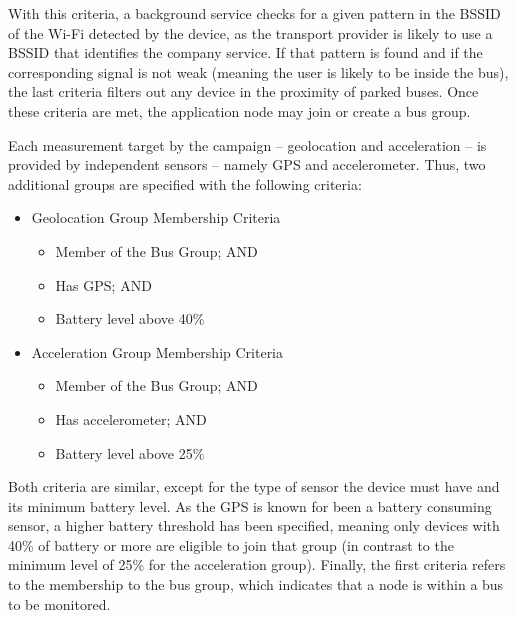With this criteria, a background service checks for a given pattern in the BSSID of the Wi-Fi detected by the device, as the transport provider is likely to use a BSSID that identifies the company service. If that pattern is found and if the corresponding signal is not weak (meaning the user is likely to be inside the bus), the last criteria filters out any device in the proximity of parked buses. Once these criteria are met, the application node may join or create a bus group.

Each measurement target by the campaign -- geolocation and acceleration -- is provided by independent sensors -- namely GPS and accelerometer. Thus, two additional groups are specified with the following criteria:

\begin{itemize}
	
	\item Geolocation Group Membership Criteria
	
	\begin{itemize}
		
		\item Member of the Bus Group; AND
		
		\item Has GPS; AND
		
		\item Battery level above 40\%
		
	\end{itemize}
	
	\item Acceleration Group Membership Criteria
	
	\begin{itemize}
		
		\item Member of the Bus Group; AND
		
		\item Has accelerometer; AND
		
		\item Battery level above 25\%
		
	\end{itemize}
	
\end{itemize}

Both criteria are similar, except for the type of sensor the device must have and its minimum battery level. As the GPS is known for been a battery consuming sensor, a higher battery threshold has been specified, meaning only devices with 40\% of battery or more are eligible to join that group (in contrast to the minimum level of 25\% for the acceleration group). Finally, the first criteria refers to the membership to the bus group, which indicates that a node is within a bus to be monitored.


